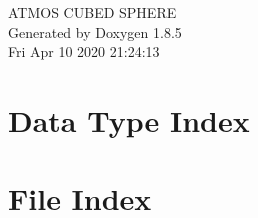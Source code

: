 \documentclass[twoside]{book}
\newcommand{\clearemptydoublepage}{%
  \newpage{\pagestyle{empty}\cleardoublepage}%
}
\begin{document}
\begin{titlepage}
\vspace*{7cm}
\begin{center}%
{\Large A\-T\-M\-O\-S C\-U\-B\-E\-D S\-P\-H\-E\-R\-E }\\
\vspace*{1cm}
{\large Generated by Doxygen 1.8.5}\\
\vspace*{0.5cm}
{\small Fri Apr 10 2020 21:24:13}\\
\end{center}
\end{titlepage}
\clearemptydoublepage
\tableofcontents
\clearemptydoublepage
{}

\chapter{Data Type Index}

\chapter{File Index}

\end{document}
